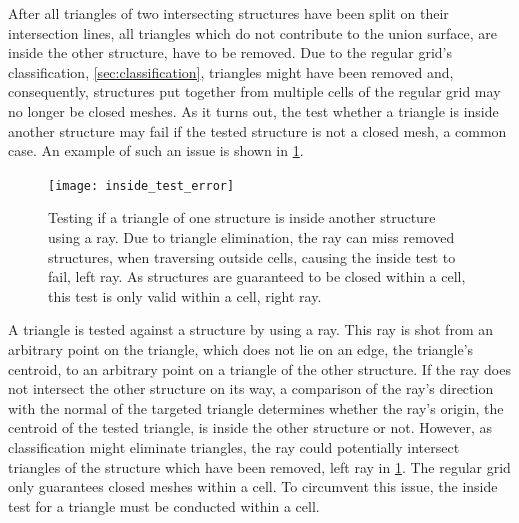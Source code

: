 After all triangles of two intersecting structures have been split on their intersection lines, all triangles which do not contribute to the union surface, \ie are inside the other structure, have to be removed.
Due to the regular grid's classification, \cf \cref{sec:classification}, triangles might have been removed and, consequently, structures put together from multiple cells of the regular grid may no longer be closed meshes.
As it turns out, the test whether a triangle is inside another structure may fail if the tested structure is not a closed mesh, a common case.
An example of such an issue is shown in \cref{fig:inside_test_error}.
%
\begin{figure}[!]
	\centering
	\texttt{[image: inside\_test\_error]}
	\caption{
		Testing if a triangle of one structure is inside another structure using a ray.
		Due to triangle elimination, the ray can miss removed structures, \eg when traversing outside cells, causing the inside test to fail, \cf left ray.
		As structures are guaranteed to be closed within a cell, this test is only valid within a cell, \cf right ray.
	}
	\label{fig:inside_test_error}
\end{figure}
%
A triangle is tested against a structure by using a ray.
This ray is shot from an arbitrary point on the triangle, which does not lie on an edge, \eg the triangle's centroid, to an arbitrary point on a triangle of the other structure.
If the ray does not intersect the other structure on its way, a comparison of the ray's direction with the normal of the targeted triangle determines whether the ray's origin, \ie the centroid of the tested triangle, is inside the other structure or not.
However, as classification might eliminate triangles, the ray could potentially intersect triangles of the structure which have been removed, \cf left ray in \cref{fig:inside_test_error}.
The regular grid only guarantees closed meshes within a cell.
To circumvent this issue, the inside test for a triangle must be conducted within a cell.

